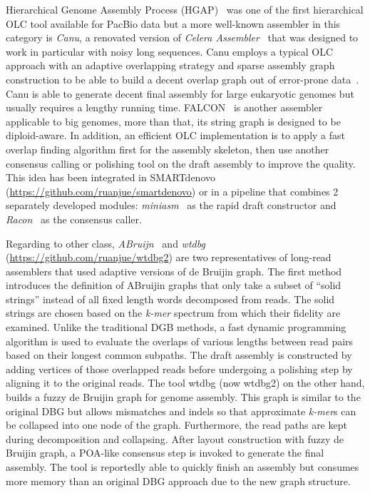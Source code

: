 Hierarchical Genome Assembly Process (HGAP)~\cite{ChinAM2013} was one of the first hierarchical OLC tool available for PacBio data but a more well-known assembler in this category is \emph{Canu}, a renovated version of \emph{Celera Assembler}~\cite{MyersSD2000} that was designed to work in particular with noisy long sequences. Canu employs a typical OLC approach with an adaptive overlapping strategy and sparse assembly graph construction to be able to build a decent overlap graph out of error-prone data~\cite{Koren2017canu}. Canu is able to generate decent final assembly for large eukaryotic genomes but usually requires a lengthy running time.
FALCON~\cite{Chin2016facon} is another assembler applicable to big genomes, more than that, its string graph is designed to be diploid-aware.
In addition, an efficient OLC implementation is to apply a fast overlap finding algorithm first for the assembly skeleton, then use another consensus calling or polishing tool on the draft assembly to improve the quality. This idea has been integrated in SMARTdenovo (\url{https://github.com/ruanjue/smartdenovo}) or in a pipeline that combines 2 separately developed modules: \emph{miniasm}~\cite{Li2016} as the rapid draft constructor and \emph{Racon}~\cite{Vaser2017racon} as the consensus caller. %


Regarding to other class, \emph{ABruijn}~\cite{Lin2016abruijin} and \emph{wtdbg} (\url{https://github.com/ruanjue/wtdbg2}) are two representatives of long-read assemblers that used adaptive versions of de Bruijin graph.
The first method introduces the definition of ABruijin graphs that only take a subset of ``solid strings'' instead of all fixed length words decomposed from reads. The solid strings are chosen based on the \emph{k-mer} spectrum from which their fidelity are examined.
Unlike the traditional DGB methods, a fast dynamic programming algorithm is used to evaluate the overlaps of various lengths between read pairs based on their longest common subpaths. The draft assembly is constructed by adding vertices of those overlapped reads before undergoing a polishing step by aligning it to the original reads.
The tool wtdbg (now wtdbg2) on the other hand, builds a fuzzy de Bruijin graph for genome assembly. This graph is similar to the original DBG but allows mismatches and indels so that approximate \emph{k-mer}s can be collapsed into one node of the graph. Furthermore, the read paths are kept during decomposition and collapsing. After layout construction with fuzzy de Bruijin graph, a POA-like consensus step is invoked to generate the final assembly. 
The tool is reportedly able to quickly finish an assembly but consumes more memory than an original DBG approach due to the new graph structure. 

